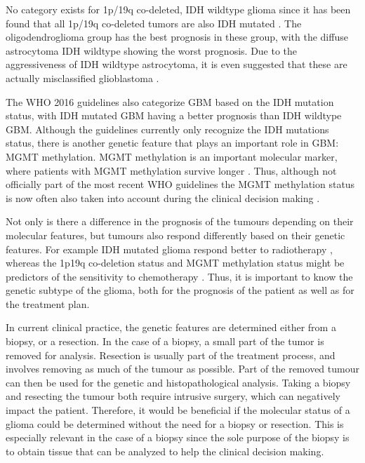 No category exists for 1p/19q co-deleted, \gls{IDH} wildtype glioma since it has been found that all 1p/19q co-deleted tumors are also IDH mutated \autocite{labussi20101p19qcodeletedIDH}. The oligodendroglioma group has the best prognosis in these group, with the diffuse astrocytoma IDH wildtype showing the worst prognosis.
Due to the aggressiveness of IDH wildtype astrocytoma, it is even suggested that these are actually misclassified glioblastoma \autocite{hartmann2010IDH1gbm, brat2018IMPACT}.

The \gls{WHO} 2016 guidelines also categorize \gls{GBM} based on the \gls{IDH} mutation status, with \gls{IDH} mutated \gls{GBM} having a better prognosis than \gls{IDH} wildtype \gls{GBM}.
Although the guidelines currently only recognize the \gls{IDH} mutations status, there is another genetic feature that plays an important role in \gls{GBM}: \gls{MGMT} methylation.
\gls{MGMT} methylation is an important molecular marker, where patients with \gls{MGMT} methylation survive longer \autocite{martinez2007MGMT, gessler2018MGMT, weller2009molecularGBM}.
Thus, although not officially part of the most recent \gls{WHO} guidelines the \gls{MGMT} methylation status is now often also taken into account during the clinical decision making \cite{molinaro2019geneticepidemiology}.

Not only is there a difference in the prognosis of the tumours depending on their molecular features, but tumours also respond differently based on their genetic features.
For example \gls{IDH} mutated glioma respond better to radiotherapy \autocite{juratli2015IDHtreatment}, whereas the 1p19q co-deletion status and MGMT methylation status might be predictors of the sensitivity to chemotherapy \autocite{idbaih2007markersresponse}.
Thus, it is important to know the genetic subtype of the glioma, both for the prognosis of the patient as well as for the treatment plan.

In current clinical practice, the genetic features are determined either from a biopsy, or a resection.
In the case of a biopsy, a small part of the tumor is removed for analysis.
Resection is usually part of the treatment process, and involves removing as much of the tumour as possible.
Part of the removed tumour can then be used for the genetic and histopathological analysis.
Taking a biopsy and resecting the tumour both require intrusive surgery, which can negatively impact the patient.
Therefore, it would be beneficial if the molecular status of a glioma could be determined without the need for a biopsy or resection.
This is especially relevant in the case of a biopsy since the sole purpose of the biopsy is to obtain tissue that can be analyzed to help the clinical decision making.

